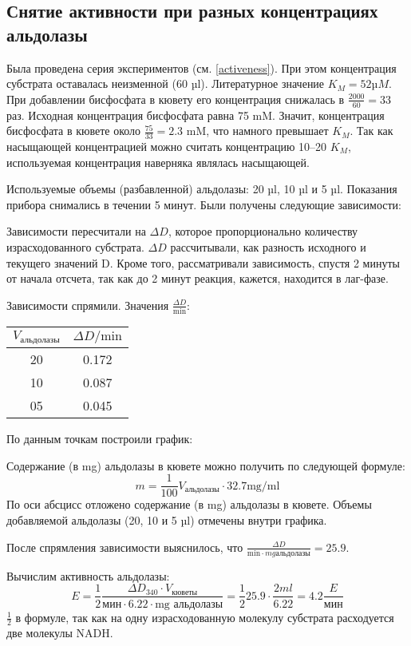 \subsection{Снятие активности при разных концентрациях альдолазы}
Была проведена серия экспериментов (см. \ref{activeness}).
При этом концентрация субстрата оставалась неизменной (60 µl).
Литературное значение $K_M = 52 µM$.
При добавлении бисфосфата в кювету его концентрация снижалась в $\frac{2000}{60} = 33$ раз.
Исходная концентрация бисфосфата равна 75 mM.
Значит, концентрация бисфосфата в кювете около $\frac{75}{33} = 2.3$ mM,
что намного превышает $K_M$.
Так как насыщающей концентрацией можно считать концентрацию 10--20 $K_M$,
используемая концентрация наверняка являлась насыщающей.

Используемые объемы (разбавленной) альдолазы: 20 µl, 10 µl и 5 µl.
Показания прибора снимались в течении 5 минут.
Были получены следующие зависимости:



Зависимости пересчитали на $\Delta D$, которое пропорционально количеству израсходованного субстрата.
$\Delta D$ рассчитывали, как разность исходного и текущего значений D.
Кроме того, рассматривали зависимость, спустя 2 минуты от начала отсчета,
так как до 2 минут реакция, кажется, находится в лаг-фазе.



Зависимости спрямили. Значения $\frac{\Delta D}{\text{min}}$:

\begin{tabular}{|c|c|}
\hline
$ V_{\text{альдолазы}} $ & $ \Delta D / \text{min} $ \\
\hline
20 & 0.172 \\
10 & 0.087 \\
05 & 0.045 \\
\hline
\end{tabular}

По данным точкам построили график:



Содержание (в mg) альдолазы в кювете можно получить по следующей формуле:
$$ m = \frac{1}{100} V_\text{альдолазы} \cdot 32.7 \text{mg/ml} $$
По оси абсцисс отложено содержание (в mg) альдолазы в кювете.
Объемы добавляемой альдолазы (20, 10 и 5 µl) отмечены внутри графика.

После спрямления зависимости выяснилось, что
$\frac{\Delta D}{\text{min} \cdot {mg альдолазы}} = 25.9$.

Вычислим активность альдолазы:
$$ E = \frac{1}{2} \frac{\Delta D_{340} \cdot V_{кюветы}}{\text{мин} \cdot 6.22 \cdot \text{mg альдолазы}} =
    \frac{1}{2} 25.9 \cdot \frac{2 ml}{6.22} = 4.2 \frac{E}{\text{мин}}$$
$\frac{1}{2}$ в формуле, так как на одну израсходованную молекулу субстрата
расходуется две молекулы NADH.

